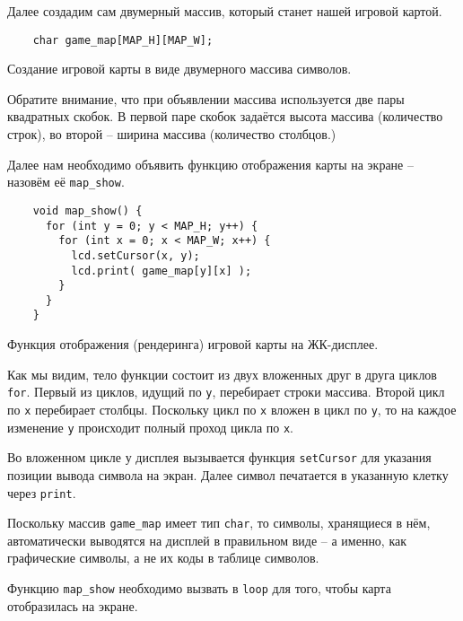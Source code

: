 \documentclass[../sparc.tex]{subfiles}
\begin{document}
Далее создадим сам двумерный массив, который станет нашей игровой картой.

\begin{listing}[H]
  \begin{verbatim}
    char game_map[MAP_H][MAP_W];
  \end{verbatim}
  \caption{Создание игровой карты в виде двумерного массива символов.}
  \label{listing:game-dev-map-array}
\end{listing}

Обратите внимание, что при объявлении массива используется две пары квадратных
скобок.  В первой паре скобок задаётся высота массива (количество строк), во
второй -- ширина массива (количество столбцов.)

Далее нам необходимо объявить функцию отображения карты на экране -- назовём её
\texttt{map\_show}.

\begin{listing}[ht]
  \begin{verbatim}
    void map_show() {
      for (int y = 0; y < MAP_H; y++) {
        for (int x = 0; x < MAP_W; x++) {
          lcd.setCursor(x, y);
          lcd.print( game_map[y][x] );
        }
      }
    }
  \end{verbatim}
  \caption{Функция отображения (рендеринга) игровой карты на ЖК-дисплее.}
  \label{listing:game-dev-map-show}
\end{listing}

Как мы видим, тело функции состоит из двух вложенных друг в друга циклов
\texttt{for}.  Первый из циклов, идущий по \texttt{y}, перебирает строки
массива.  Второй цикл по \texttt{x} перебирает столбцы.  Поскольку цикл по
\texttt{x} вложен в цикл по \texttt{y}, то на каждое изменение \texttt{y}
происходит полный проход цикла по \texttt{x}.

Во вложенном цикле у дисплея вызывается функция \texttt{setCursor} для указания
позиции вывода символа на экран.  Далее символ печатается в указанную клетку
через \texttt{print}.

Поскольку массив \texttt{game\_map} имеет тип \texttt{char}, то символы,
хранящиеся в нём, автоматически выводятся на дисплей в правильном виде -- а
именно, как графические символы, а не их коды в таблице символов.

Функцию \texttt{map\_show} необходимо вызвать в \texttt{loop} для того, чтобы
карта отобразилась на экране.
\end{document}
